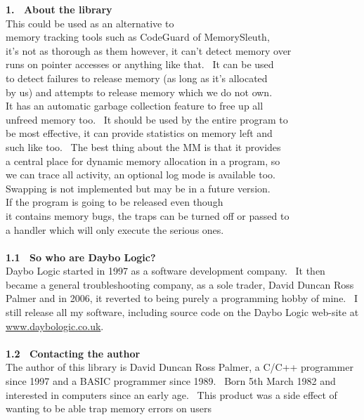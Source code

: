 \documentclass{article}
\begin{document}
\textbf{1.~ About the library}
\\
This could be used as an alternative to
\\
memory tracking tools such as CodeGuard of MemorySleuth,
\\
it's not as thorough as them however, it can't detect memory over
\\
runs on pointer accesses or anything like that.~ It can be used
\\
to detect failures to release memory (as long as it's allocated
\\
by us) and attempts to release memory which we do not own.
\\
It has an automatic garbage collection feature to free up all
\\
unfreed memory too.~ It should be used by the entire program to
\\
be most effective, it can provide statistics on memory left and
\\
such like too.~ The best thing about the MM is that it provides
\\
a central place for dynamic memory allocation in a program, so
\\
we can trace all activity, an optional log mode is available too.\\
Swapping is not implemented but may be in a future version.\\
If the program is going to be released even though
\\
it contains memory bugs, the traps can be turned off or passed to
\\
a handler which will only execute the serious ones.
\\
\\
\textbf{1.1~ So who are Daybo Logic?}
\\
Daybo Logic started in 1997 as a software development company.~ It
then became a general troubleshooting company, as a sole trader, David
Duncan Ross Palmer and in 2006, it reverted to being purely a
programming hobby of mine.~ I still release all my software,
including source code on the Daybo Logic web-site at \href{http://www.daybologic.co.uk/}{www.daybologic.co.uk}.\\
\\
\textbf{1.2~ Contacting the author}
\\
The author of this library is David Duncan Ross Palmer, a C/C++
programmer
since 1997 and a BASIC programmer since 1989.~ Born 5th March 1982
and interested in computers since an early age.~ This product was
a side effect of wanting to be able trap memory errors on users
\end{document}
